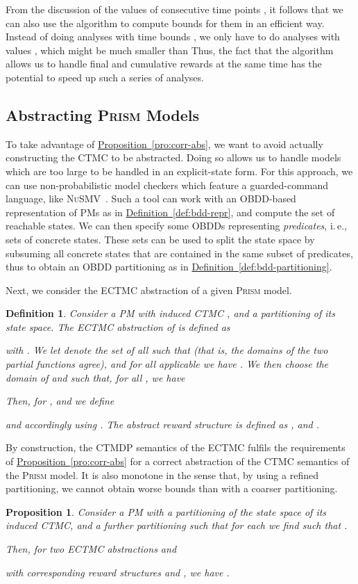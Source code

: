 \documentclass[10pt,twocolumn]{article}
\newtheorem{definition}{Definition}
\newcommand{\PRISM}{\textsc{Prism}\xspace}
\newcommand{\NUSMV}{\textsc{NuSMV}\xspace}
\newtheorem{proposition}{Proposition}
\newcommand{\refdef}[1]{\texorpdfstring{\hyperref[def:#1]{Definition~\ref*{def:#1}}}{Definition \ref*{def:#1}}}
\newcommand{\refpro}[1]{\texorpdfstring{\hyperref[pro:#1]{Proposition~\ref*{pro:#1}}}{Proposition~\ref*{pro:#1}}}
\begin{document}
From the discussion of the values of consecutive time points 
, 
it follows that we can also use the algorithm to compute bounds for
them in an efficient way. Instead of doing analyses with time bounds
, we only have to do analyses with
values , which might be much smaller than
 Thus, the fact that the algorithm
allows us to handle final and cumulative rewards at the same time has the
potential to speed up such a series of analyses.

\subsection{Abstracting \PRISM Models}

\noindent To take advantage of \refpro{corr-abs}, we want to avoid actually
constructing the CTMC to be abstracted. Doing so allows us to handle
models which are too large to be handled in an explicit-state form.
For this approach, we can use non-probabilistic model checkers which feature a
guarded-command language, like \NUSMV~\cite{CimattiCGGPRST02}. Such a
tool can work with an OBDD-based representation of PMs as in
\refdef{bdd-repr}, and compute the set of reachable states. We can
then specify some OBDDs representing \emph{predicates}, i.\,e., sets
of concrete states. These sets can be used to split the state space
by subsuming all concrete states that are contained in the same
subset of predicates, thus to obtain an OBDD partitioning as in
\refdef{bdd-partitioning}.

Next, we consider the ECTMC abstraction of a given \PRISM model.
\begin{definition}
  \label{def:cmc-abs}
Consider a PM   
  with induced CTMC , and a partitioning 
   of its state space.
  The \emph{ECTMC abstraction} of  is defined as
  
  with .
  We let  denote the set of all  such that 
   (that is, the domains of 
  the two partial functions agree), and for all applicable  
  we have .
  We then choose the domain of  and  such that, for all , we have

Then, for , and  we define

and accordingly  using .
  The abstract reward structure  is defined as ,
  and .
\end{definition}
By construction, the CTMDP semantics of the ECTMC fulfils the
requirements of \refpro{corr-abs} for a correct abstraction of the
CTMC semantics of the \PRISM model. It is also monotone in the sense
that, by using a refined partitioning, we cannot obtain worse bounds
than with a coarser partitioning.
\begin{proposition}
  \label{pro:monotone}
Consider a PM   
  with a partitioning  
  of the state space of its induced CTMC, and a further partitioning 
   such that for each 
   we find  
  such that .

  Then, for two ECTMC abstractions 
   and 
   
  with corresponding reward structures  and ,
  we have .
\end{proposition}
\end{document}
